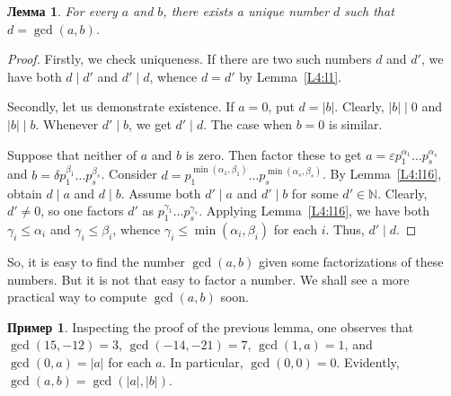 \documentclass[12pt,notitlepage]{article}
\theoremstyle{plain}
\newtheorem{lemma}[thm]{Лемма}
\theoremstyle{definition}
\newtheorem{exm}[thm]{Пример}
\theoremstyle{plain}
\newcommand{\N}{\mathbb{N}}
\newcommand{\eps}{\varepsilon}
\newcommand{\1}{\mathbf{1}}
\newcommand{\0}{\mathbf{0}}
\newcommand{\dvd}{\mathop{\mid}}
\begin{document}
\begin{lemma}
	For every $a$ and $b$, there exists a unique number $d$ such that \ $d = \gcd(a,b)$.
\end{lemma}
\begin{proof}
	Firstly, we check uniqueness. If there are two such numbers $d$ and $d'$, we have both $d \dvd d'$ and $d' \dvd d$, whence $d = d'$ by Lemma~\ref{L4:l1}.
	
	Secondly, let us demonstrate existence. If $a = 0$, put $d = |b|$. Clearly, $|b| \dvd 0$ and $|b| \dvd b$. Whenever $d' \dvd b$, we get $d' \dvd d$. The case when $b = 0$ is similar.
	
	Suppose that neither of $a$ and $b$ is zero. Then factor these to get $a = \eps p^{\alpha_1}_1\ldots p^{\alpha_s}_s$ and $b = \delta p^{\beta_1}_1\ldots p^{\beta_s}_s$. Consider $d = p^{\min(\alpha_1, \beta_1)}_1\ldots p^{\min(\alpha_s, \beta_s)}_s$. By Lemma~\ref{L4:l16}, obtain $d \dvd a$ and $d \dvd b$. Assume both $d' \dvd a$ and $d' \dvd b$ for some $d'  \in \N$. Clearly, $d' \neq 0$, so one factors $d'$ as $p^{\gamma_1}_1\ldots p^{\gamma_s}_s$. Applying Lemma~\ref{L4:l16}, we have both $\gamma_i \leq \alpha_i$ and $\gamma_i \leq \beta_i$, whence $\gamma_i \leq \min(\alpha_i, \beta_i)$ for each $i$. Thus, $d' \dvd d$.
\end{proof}

So, it is easy to find the number $\gcd(a, b)$ given some factorizations of these numbers. But it is not that easy to factor a number. We shall see a more practical way to compute $\gcd(a, b)$ soon.

\begin{exm}
	Inspecting the proof of the previous lemma, one observes that $\gcd(15, -12) = 3$, $\gcd(-14, -21) = 7$, $\gcd(1, a) = 1$, and $\gcd(0, a) = |a|$ for each $a$. In particular, $\gcd(0, 0) = 0$. Evidently, $\gcd(a, b) = \gcd(|a|,|b|)$.
\end{exm}
\end{document}
